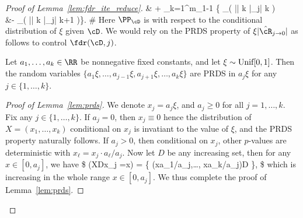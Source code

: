 \begin{proof}[Proof of Lemma~\ref{lem:fdr_ite_reduce}]
&\leq {} + \sum_{k=1}^{m_1-1} \bigg\{
\PP_{\cD}\Big( |\cR| \leq k \Biggiven \xi |\hat\cR_{j}| \leq k \Big) \notag  \\
&\qquad \qquad \qquad \qquad -
\PP_{\cD}\Big( |\cR| \leq k \Biggiven \xi |\hat\cR_{j}| \leq k+1 \Big)\bigg\}.
\#
Here $\PP_{\cD}$ is with respect to the conditional distribution of $\xi$
given $\cD$.
We would rely on the PRDS property of $\xi |\hat\cR_{j\to 0}|$
as follows to control $\fdr(\cD,j)$.
\begin{lemma}\label{lem:prds}
Let $a_1,\dots,a_k \in \RR$ be nonnegative fixed constants, and let $\xi \sim \textnormal{Unif}[0,1]$.
Then the random variables
$\{a_1\xi,\dots,a_{j-1}\xi,a_{j+1}\xi,\dots,a_k\xi\}$ are PRDS in $a_j \xi$ for any $j\in\{1,\dots,k\}$.
\end{lemma}

\begin{proof}[Proof of Lemma~\ref{lem:prds}]
We denote $x_j = a_j \xi$, and $a_j\geq 0$ for all $j=1,\dots,k$.
Fix any $j\in\{1,\dots,k\}$.
If $a_j=0$, then $x_j\equiv 0$ hence
the  distribution of $X=(x_1,\dots,x_k)$ conditional on $x_j$
is invatiant to the value of $\xi$, and the PRDS property naturally follows.
If $a_j>0$, then  conditional on $ x_j $, other $p$-values are deterministic
with $x_\ell = x_j \cdot a_\ell/ a_j $.
Now let $D$ be any increasing set, then for any $x\in [0,a_j]$, we have
\$
\PP(X\in D\given x_j =x) = \ind \big\{  (xa_1/a_j,\dots, xa_k/a_j)\in D  \big\},
\$
which is increasing in the whole range $x\in [0,a_j]$. We thus complete the proof of Lemma~\ref{lem:prds}.
\end{proof}


\end{proof}
